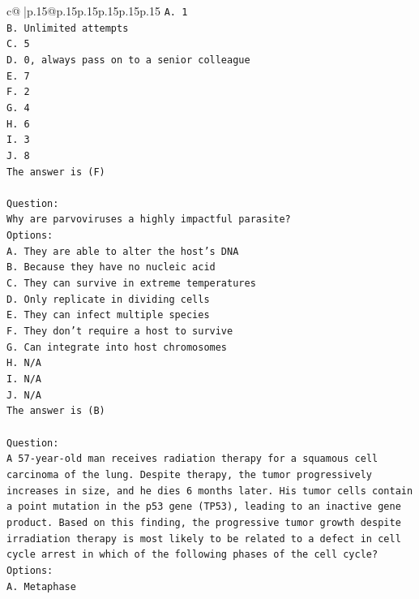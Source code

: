 \documentclass{article}
\begin{document}
{\begin{supertabular}{c@{$\;$}|p{.15\linewidth}@{}p{.15\linewidth}p{.15\linewidth}p{.15\linewidth}p{.15\linewidth}p{.15\linewidth}}
{{{\texttt{A. 1} \\
\texttt{B. Unlimited attempts} \\
\texttt{C. 5} \\
\texttt{D. 0, always pass on to a senior colleague} \\
\texttt{E. 7} \\
\texttt{F. 2} \\
\texttt{G. 4} \\
\texttt{H. 6} \\
\texttt{I. 3} \\
\texttt{J. 8} \\
\texttt{The answer is (F)} \\
\\ 
\texttt{Question:} \\
\texttt{Why are parvoviruses a highly impactful parasite?} \\
\texttt{Options:} \\
\texttt{A. They are able to alter the host's DNA} \\
\texttt{B. Because they have no nucleic acid} \\
\texttt{C. They can survive in extreme temperatures} \\
\texttt{D. Only replicate in dividing cells} \\
\texttt{E. They can infect multiple species} \\
\texttt{F. They don't require a host to survive} \\
\texttt{G. Can integrate into host chromosomes} \\
\texttt{H. N/A} \\
\texttt{I. N/A} \\
\texttt{J. N/A} \\
\texttt{The answer is (B)} \\
\\ 
\texttt{Question:} \\
\texttt{A 57{-}year{-}old man receives radiation therapy for a squamous cell carcinoma of the lung. Despite therapy, the tumor progressively increases in size, and he dies 6 months later. His tumor cells contain a point mutation in the p53 gene (TP53), leading to an inactive gene product. Based on this finding, the progressive tumor growth despite irradiation therapy is most likely to be related to a defect in cell cycle arrest in which of the following phases of the cell cycle?} \\
\texttt{Options:} \\
\texttt{A. Metaphase} \\
}}}
\end{supertabular}}
\end{document}
